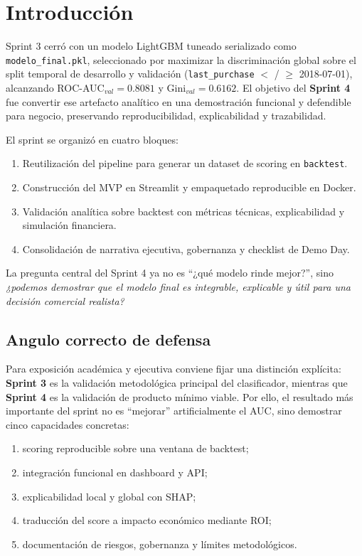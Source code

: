 \documentclass[journal,letterpaper]{IEEEtran}
\begin{document}
\section{Introducción}
 Sprint 3 cerró con un modelo LightGBM tuneado serializado como \texttt{modelo\_final.pkl}, seleccionado por maximizar la discriminación global sobre el split temporal de desarrollo y validación (\texttt{last\_purchase} $<$ / $\geq$ 2018-07-01), alcanzando ROC-AUC$_{val}=0.8081$ y Gini$_{val}=0.6162$. El objetivo del \textbf{Sprint 4} fue convertir ese artefacto analítico en una demostración funcional y defendible para negocio, preservando reproducibilidad, explicabilidad y trazabilidad.

El sprint se organizó en cuatro bloques:
\begin{enumerate}
    \item Reutilización del pipeline para generar un dataset de scoring en \texttt{backtest}.
    \item Construcción del MVP en Streamlit y empaquetado reproducible en Docker.
    \item Validación analítica sobre backtest con métricas técnicas, explicabilidad y simulación financiera.
    \item Consolidación de narrativa ejecutiva, gobernanza y checklist de Demo Day.
\end{enumerate}

La pregunta central del Sprint 4 ya no es ``¿qué modelo rinde mejor?'', sino \textit{¿podemos demostrar que el modelo final es integrable, explicable y útil para una decisión comercial realista?}

\subsection{Angulo correcto de defensa}
Para exposición académica y ejecutiva conviene fijar una distinción explícita: \textbf{Sprint 3} es la validación metodológica principal del clasificador, mientras que \textbf{Sprint 4} es la validación de producto mínimo viable. Por ello, el resultado más importante del sprint no es ``mejorar'' artificialmente el AUC, sino demostrar cinco capacidades concretas:
\begin{enumerate}
    \item scoring reproducible sobre una ventana de backtest;
    \item integración funcional en dashboard y API;
    \item explicabilidad local y global con SHAP;
    \item traducción del score a impacto económico mediante ROI;
    \item documentación de riesgos, gobernanza y límites metodológicos.
\end{enumerate}
\end{document}

